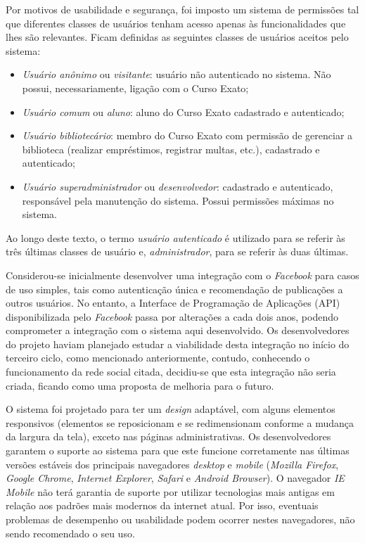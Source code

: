 \documentclass[a4paper]{article}
\begin{document}
Por motivos de usabilidade e segurança, foi imposto um sistema de permissões tal que diferentes classes de usuários tenham acesso apenas às funcionalidades que lhes são relevantes. Ficam definidas as seguintes classes de usuários aceitos pelo sistema:
\begin{itemize}
\item \emph{Usuário anônimo} ou \emph{visitante}: usuário não autenticado no sistema. Não possui, necessariamente, ligação com o Curso Exato;
\item \emph{Usuário comum} ou \emph{aluno}: aluno do Curso Exato cadastrado e autenticado;
\item \emph{Usuário bibliotecário}: membro do Curso Exato com permissão de gerenciar a biblioteca (realizar empréstimos, registrar multas, etc.), cadastrado e autenticado;
\item \emph{Usuário superadministrador} ou \emph{desenvolvedor}: cadastrado e autenticado, responsável pela manutenção do sistema. Possui permissões máximas no sistema.
\end{itemize}
Ao longo deste texto, o termo \emph{usuário autenticado} é utilizado para se referir às três últimas classes de usuário e, \emph{administrador}, para se referir às duas últimas.

Considerou-se inicialmente desenvolver uma integração com o \textit{Facebook} para casos de uso simples, tais como autenticação única e recomendação de publicações a outros usuários. No entanto, a Interface de Programação de Aplicações (API) disponibilizada pelo \textit{Facebook} passa por alterações a cada dois anos, podendo comprometer a integração com o sistema aqui desenvolvido. Os  desenvolvedores do projeto haviam planejado estudar a viabilidade desta integração no início do terceiro ciclo, como mencionado anteriormente, contudo, conhecendo o funcionamento da rede social citada, decidiu-se que esta integração não seria criada, ficando como uma proposta de melhoria para o futuro.

O sistema foi projetado para ter um \textit{design} adaptável, com alguns elementos responsivos (elementos se reposicionam e se redimensionam conforme a mudança da largura da tela), exceto nas páginas administrativas. Os desenvolvedores garantem o suporte ao sistema para que este funcione corretamente nas últimas versões estáveis dos principais navegadores \textit{desktop} e \textit{mobile} (\textit{Mozilla Firefox}, \textit{Google Chrome}, \textit{Internet Explorer}, \textit{Safari} e \textit{Android Browser}). O navegador \textit{IE Mobile} não terá garantia de suporte por utilizar tecnologias mais antigas em relação aos padrões mais modernos da internet atual. Por isso, eventuais problemas de desempenho ou usabilidade podem ocorrer nestes navegadores, não sendo recomendado o seu uso.
\end{document}
